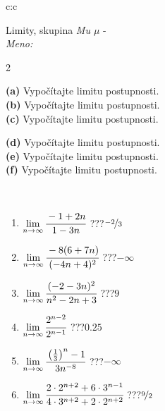 \documentclass[10pt]{report}
\begin{document}
\newpage
\thispagestyle{empty}
\begin{tabular}{c:c}
\begin{minipage}[c][104.5mm][t]{0.5\linewidth}
\begin{center}
\vspace{5mm}
{\huge Limity, skupina \textit{Mu $\mu$} -}\\[5mm]
\textit{Meno:}\phantom{xxxxxxxxxxxxxxxxxxxxxxxxxxxxxxxxxxxxxxxxxxxxxxxxxxxxxxxxxxxxxxxxx}\\[5mm]
\begin{minipage}{0.95\linewidth}
\begin{center}
{\small \begin{multicols}{2} \raggedright
\textbf{(a)} Vypočítajte limitu postupnosti. \\[1mm]
\textbf{(b)} Vypočítajte limitu postupnosti. \\[1mm]
\textbf{(c)} Vypočítajte limitu postupnosti. \par \columnbreak
\textbf{(d)} Vypočítajte limitu postupnosti. \\[1mm]
\textbf{(e)} Vypočítajte limitu postupnosti. \\[1mm]
\textbf{(f)} Vypočítajte limitu postupnosti.
\end{multicols}
}
\end{center}
\end{minipage}
\\[1mm]
\begin{minipage}{0.79\linewidth}
\begin{center}
\begin{varwidth}{\linewidth}
\setlength{\itemsep}{0pt}
\begin{enumerate}
\footnotesizerr
\item $\lim\limits_{n\to\infty}\cfrac{-1+2n}{1-3n}$\quad \dotfill\; ???\;\dotfill \quad $\nicefrac{-2}{3}$
\item $\lim\limits_{n\to\infty}\cfrac{-8(6+7n)}{(-4n+4)^2}$\quad \dotfill\; ???\;\dotfill \quad $-\infty$
\item $\lim\limits_{n\to\infty}\cfrac{(-2-3n)^2}{n^2-2n+3}$\quad \dotfill\; ???\;\dotfill \quad $9$
\item $\lim\limits_{n\to\infty}\cfrac{2^{n-2}}{2^{n-1}}$\quad \dotfill\; ???\;\dotfill \quad $0.25$
\item $\lim\limits_{n\to\infty}\cfrac{\left(\frac{1}{3}\right)^n -1}{3n^{-8}}$\quad \dotfill\; ???\;\dotfill \quad $-\infty$
\item $\lim\limits_{n\to\infty}\cfrac{2\cdot 2^{n+2}+6\cdot 3^{n-1}}{4\cdot 3^{n+2}+2\cdot 2^{n+2}}$\quad \dotfill\; ???\;\dotfill \quad $\nicefrac{9}{2}$

\end{enumerate}
\end{varwidth}
\end{center}
\end{minipage}
\end{center}
\end{minipage}
\end{tabular}
\end{document}
